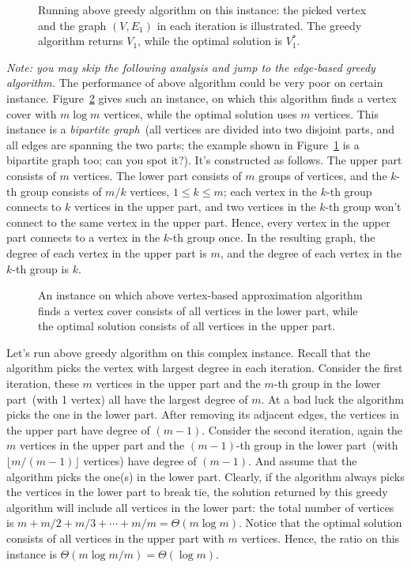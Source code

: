 \documentclass[letterpaper,11pt]{article}
\theoremstyle{mytheorem}
\begin{document}
\begin{figure}[h]
\centering{}
\caption{Running above greedy algorithm on this instance:
	the picked vertex and the graph $(V, E_1)$
	in each iteration is illustrated. 
The greedy algorithm returns $V_1$, while the optimal solution is $V_1^*$.}
\label{fig:greedy1}
\end{figure}

\emph{Note: you may skip the following analysis and jump to the edge-based greedy algorithm.}
The performance of above algorithm could be very poor on certain instance.
Figure~\ref{fig:logn} gives such an instance, on which this algorithm
finds a vertex cover with $m\log m$ vertices, while the optimal solution
uses $m$ vertices. This instance is a \emph{bipartite graph}~(all vertices
are divided into two disjoint parts, and all edges are spanning the two parts;
the example shown in Figure~\ref{fig:greedy1} is a bipartite graph too; can you spot it?).
It's constructed as follows. The upper part consists of $m$ vertices.
The lower part consists of $m$ groups of vertices, and the $k$-th group
consists of $m/k$ vertices, $1\le k \le m$; 
each vertex in the $k$-th group connects to $k$ vertices
in the upper part, and two vertices in the $k$-th group
won't connect to the same vertex in the upper part.
Hence, every vertex in the upper part connects to a vertex in the $k$-th group once.
In the resulting graph, the degree of each vertex in the upper part is $m$,
and the degree of each vertex in the $k$-th group is $k$.

\begin{figure}[h]
\centering{}
\caption{An instance on which above vertex-based approximation 
algorithm finds a vertex cover consists of all vertices in the
lower part, while the optimal solution consists of all vertices
in the upper part.}
\label{fig:logn}
\end{figure}

Let's run above greedy algorithm on this complex instance.
Recall that the algorithm picks the vertex with largest degree in
each iteration. %
Consider the first iteration, 
these $m$ vertices in the upper part and the $m$-th group in the lower part~(with 1 vertex)
all have the largest degree of $m$.
At a bad luck the algorithm picks the one in the lower part.
After removing its adjacent edges, the vertices in the upper part
have degree of $(m-1)$.
Consider the second iteration,
again the $m$ vertices in the upper part and the $(m-1)$-th group in the lower part~(with $\lfloor m/(m-1) \rfloor$ vertices)
have degree of $(m-1)$.
And assume that the algorithm picks the one(s) in the lower part.
Clearly, if the algorithm always picks the vertices in the lower part
to break tie, the solution returned by this greedy algorithm will include all vertices in the lower part: the total
number of vertices is $m + m/2 + m/3 + \cdots + m/m = \Theta(m\log m)$.
Notice that the optimal solution consists of all vertices in the upper part with $m$ vertices.
Hence, the ratio on this instance is $\Theta(m\log m / m) = \Theta(\log m)$.
\end{document}
